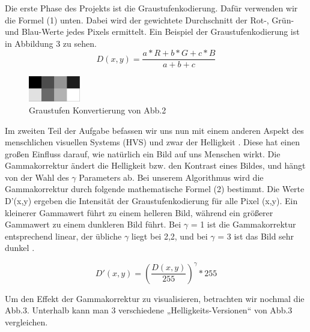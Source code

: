 \documentclass[course=erap]{aspdoc}
\begin{document}
\par
Die erste Phase des Projekts ist die Graustufenkodierung. Dafür verwenden wir die Formel (1) unten. Dabei wird der gewichtete Durchschnitt der Rot-, Grün- und Blau-Werte jedes Pixels ermittelt. Ein Beispiel der Graustufenkodierung ist in Abbildung 3 zu sehen. 
\begin{equation}
D(x,y) = \frac{a*R+b*G+c*B}{a+b+c}
\end{equation}


\begin{figure}[h]
\centering
\includegraphics[width=0.2\textwidth]{Bilder/gamma1.pgm.png}
\caption{Graustufen Konvertierung von Abb.2}
\end{figure}

\par
Im zweiten Teil der Aufgabe befassen wir uns nun mit einem anderen Aspekt des menschlichen visuellen Systems (HVS) und zwar der Helligkeit \cite{westin2011gammacorrection}. Diese hat einen großen Einfluss darauf, wie natürlich ein Bild auf uns Menschen wirkt. Die Gammakorrektur ändert die Helligkeit bzw. den Kontrast eines Bildes, und hängt von der Wahl des $ \gamma $ Parameters ab. Bei unserem Algorithmus wird die Gammakorrektur durch folgende mathematische Formel (2) bestimmt. Die Werte D'(x,y) ergeben die Intensität der Graustufenkodierung für alle Pixel (x,y). Ein kleinerer Gammawert führt zu einem helleren Bild, während ein größerer Gammawert zu einem dunkleren Bild führt. Bei $\gamma$ = 1 ist die Gammakorrektur entsprechend linear, der übliche $\gamma$ liegt bei 2,2, und bei $\gamma$ = 3 ist das Bild sehr dunkel \cite{cambridgeincolor2020gammacorrection}.

\begin{equation}
D'(x,y) = {\left( \frac{D(x,y)}{255} \right)}^{\gamma}*255
\end{equation}

\par
Um den Effekt der Gammakorrektur zu visualisieren, betrachten wir nochmal die Abb.3. Unterhalb kann man 3 verschiedene „Helligkeits-Versionen“ von Abb.3 vergleichen.
\end{document}
